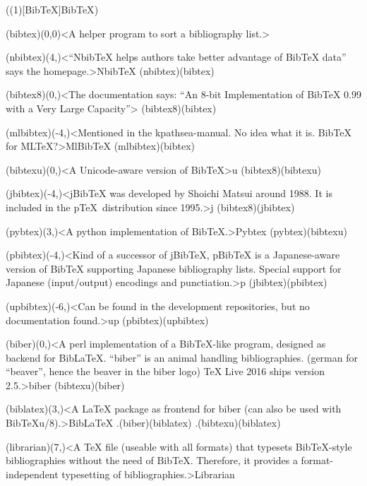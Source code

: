 \tograph(\tostruct(1)[Bib\TeX]{Bib\TeX}){
	\tonode(bibtex)(0,0)<A helper program to sort a bibliography list.>{\BibTeX}
	\steplayer[-1]

	\tonode(nbibtex)(4,\layer)<“NbibTeX helps authors take better advantage of BibTeX data” says the homepage.>{NbibTeX}
	\todraw(nbibtex)(bibtex)
	\steplayer[-0.5]

	\tonode(bibtex8)(0,\layer)<The documentation says: “An 8-bit Implementation of BibTeX 0.99 with a Very Large Capacity”>{}
	\todraw(bibtex8)(bibtex)

	\tonode(mlbibtex)(-4,\layer)<Mentioned in the kpathsea-manual. No idea what it is. BibTeX for MLTeX?>{MlBibTeX}
	\todraw(mlbibtex)(bibtex)
	\steplayer
	
	\tonode(bibtexu)(0,\layer)<A Unicode-aware version of BibTeX>{\BibTeX u}
	\todraw(bibtex8)(bibtexu)

	\tonode(jbibtex)(-4,\layer)<jBibTeX was developed by Shoichi Matsui around 1988. It is included in the p\TeX\ distribution since 1995.>{j\BibTeX}
	\todraw(bibtex8)(jbibtex)

	\tonode(pybtex)(3,\layer)<A python implementation of BibTeX.>{Pybtex}
	\todraw(pybtex)(bibtexu)
	\steplayer

	\tonode(pbibtex)(-4,\layer)<Kind of a successor of jBibTeX, pBibTeX is a Japanese-aware version of BibTeX supporting Japanese bibliography lists. Special support for Japanese (input/output) encodings and punctiation.>{p\BibTeX}
	\todraw(jbibtex)(pbibtex)
	\steplayer

	\tonode(upbibtex)(-6,\layer)<Can be found in the development repositories, but no documentation found.>{up\BibTeX}
	\todraw(pbibtex)(upbibtex)
	\steplayer
	
	\tonode(biber)(0,\layer)<A perl implementation of a BibTeX-like program, designed as backend for BibLaTeX. “biber” is an animal handling bibliographies. (german for “beaver”, hence the beaver in the biber logo) TeX Live 2016 ships version 2.5.>{biber}
	\todraw(bibtexu)(biber)
	
	\steplayer

	\tonode[\package](biblatex)(3,\layer)<A LaTeX package as frontend for biber (can also be used with BibTeXu/8).>{Bib\LaTeX}
	\todraw.(biber)(biblatex)
	\todraw.(bibtexu)(biblatex)

	\tonode[\package](librarian)(7,\layer)<A TeX file (useable with all formats) that typesets BibTeX-style bibliographies without the need of BibTeX. Therefore, it provides a format-independent typesetting of bibliographies.>{Librarian}
}

